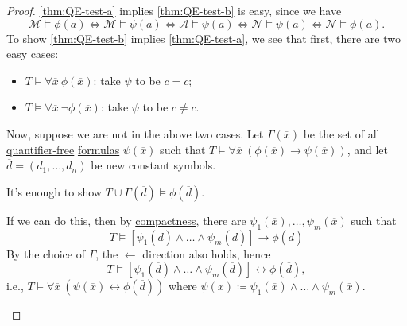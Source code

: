 \begin{proof}
	\autoref{thm:QE-test-a} implies \autoref{thm:QE-test-b} is easy, since we have
	\[
		\mathcal{M} \models \phi (\overline{a} )
		\iff \mathcal{M} \models \psi (\overline{a} )
		\iff \mathcal{A} \models \psi (\overline{a} )
		\iff \mathcal{N} \models \psi (\overline{a} )
		\iff \mathcal{N} \models \phi (\overline{a} ).
	\]
	To show \autoref{thm:QE-test-b} implies \autoref{thm:QE-test-a}, we see that first, there are two easy cases:
	\begin{itemize}
		\item \(T \models \forall \overline{x} \ \phi (\overline{x} )\): take \(\psi \) to be \(c = c\);
		\item \(T \models \forall \overline{x} \ \lnot \phi (\overline{x} )\): take \(\psi \) to be \(c \neq c\).
	\end{itemize}
	Now, suppose we are not in the above two cases. Let \(\Gamma (\overline{x} )\) be the set of all \hyperref[not:quantifier-free]{quantifier-free} \hyperref[def:formula]{formulas} \(\psi (\overline{x} )\) such that \(T \models \forall \overline{x} \ (\phi (\overline{x} ) \to \psi (\overline{x} ))\), and let \(\overline{d} = (d_1, \ldots , d_n)\) be new constant symbols.
	\begin{claim}
		It's enough to show \(T \cup \Gamma (\overline{d} ) \models \phi (\overline{d} )\).
	\end{claim}
	\begin{explanation}
		If we can do this, then by \hyperref[thm:compactness]{compactness}, there are \(\psi _1(\overline{x}) , \ldots , \psi _m(\overline{x} )\) such that
		\[
			T \models \left[ \psi _1(\overline{d} ) \land \ldots \land \psi _m(\overline{d} ) \right] \to \phi (\overline{d} )
		\]
		By the choice of \(\Gamma \), the \(\gets\) direction also holds, hence
		\[
			T \models \left[ \psi _1(\overline{d} ) \land \ldots \land \psi _m(\overline{d} ) \right] \leftrightarrow \phi (\overline{d} ),
		\]
		i.e., \(T \models \forall \overline{x} \ (\psi (\overline{x} ) \leftrightarrow \phi (\overline{d} ))\) where \(\psi (x) \coloneqq \psi _1(\overline{x} ) \land \ldots \land \psi _m(\overline{x} )\).
	\end{explanation}


\end{proof}
